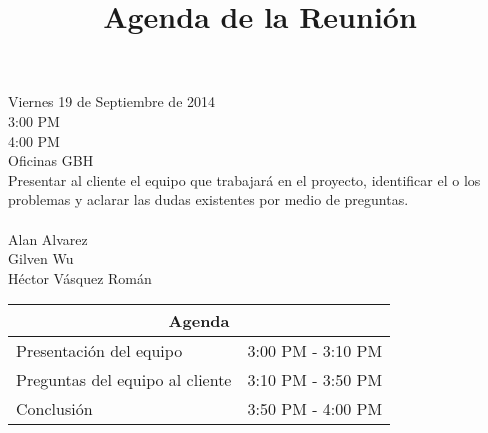 \documentclass{article}
\begin{document}
\title{\bfseries Agenda de la Reuni\'{o}n}
\date{}
\maketitle

 Viernes 19 de Septiembre de 2014\\
 3:00 PM\\
 4:00 PM\\
 Oficinas GBH\\[0.3in]
 Presentar al cliente el equipo que trabajar\'{a} en el proyecto, identificar el o los problemas y aclarar las dudas
existentes por medio de preguntas.\\[0.3in]
\\
\indent Alan Alvarez\\
\indent Gilven Wu\\
\indent H\'{e}ctor V\'{a}squez Rom\'{a}n\\[0.3in]    
\begin{center}
    \begin{tabular}{|l|l|}
        \hline
        \multicolumn{2}{|c|}{\bfseries Agenda}\\
        \hline
        Presentaci\'{o}n del equipo&3:00 PM - 3:10 PM\\
        \hline
        Preguntas del equipo al cliente&3:10 PM - 3:50 PM\\
        \hline
        Conclusi\'{o}n&3:50 PM - 4:00 PM\\
        \hline
    \end{tabular}
\end{center}
\end{document}
